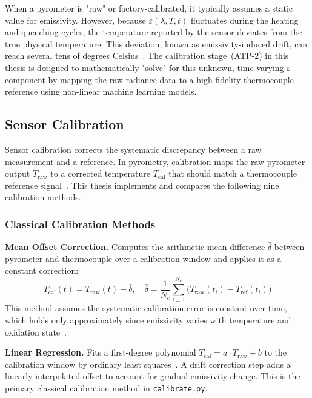 When a pyrometer is "raw" or factory-calibrated, it typically assumes a static value for emissivity. However, because $\varepsilon(\lambda, T, t)$ fluctuates during the heating and quenching cycles, the temperature reported by the sensor deviates from the true physical temperature. This deviation, known as emissivity-induced drift, can reach several tens of degrees Celsius~\cite{online_pyrometry_calibration}. The calibration stage~(ATP-2) in this thesis is designed to mathematically "solve" for this unknown, time-varying $\varepsilon$ component by mapping the raw radiance data to a high-fidelity thermocouple reference using non-linear machine learning models.

\subsection{Sensor Calibration}
\label{subsec:calibration_bg}

Sensor calibration corrects the systematic discrepancy between a raw measurement and a reference. In pyrometry, calibration maps the raw pyrometer output $T_{\text{raw}}$ to a corrected temperature $T_{\text{cal}}$ that should match a thermocouple reference signal~\cite{online_pyrometry_calibration}. This thesis implements and compares the following nine calibration methods.

\subsubsection*{Classical Calibration Methods}

\textbf{Mean Offset Correction.} Computes the arithmetic mean difference $\bar{\delta}$ between pyrometer and thermocouple over a calibration window and applies it as a constant correction:
\begin{equation}
T_{\text{cal}}(t) = T_{\text{raw}}(t) - \bar{\delta}, \quad
\bar{\delta} = \frac{1}{N_c}\sum_{i=1}^{N_c}\bigl(T_{\text{raw}}(t_i) - T_{\text{ref}}(t_i)\bigr)
\label{eq:mean_offset}
\end{equation}
This method assumes the systematic calibration error is constant over time, which holds only approximately since emissivity varies with temperature and oxidation state~\cite{emissivity_measurement}.

\textbf{Linear Regression.} Fits a first-degree polynomial $T_{\text{cal}} = a \cdot T_{\text{raw}} + b$ to the calibration window by ordinary least squares~\cite{online_pyrometry_calibration}. A drift correction step adds a linearly interpolated offset to account for gradual emissivity change. This is the primary classical calibration method in \texttt{calibrate.py}.

